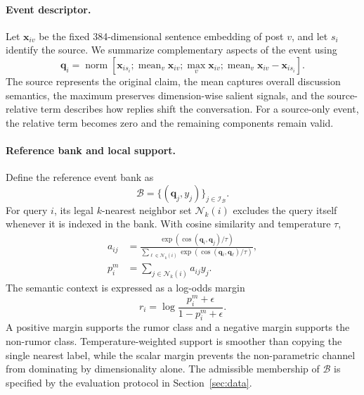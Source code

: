 \documentclass[sigconf,anonymous,review]{../acmart/acmart}
\newcommand{\norm}{\operatorname{norm}}
\newcommand{\mean}{\operatorname{mean}}
\newcommand{\maxpool}{\operatorname{max}}
\begin{document}
\paragraph{Event descriptor.}
Let $\boldsymbol{x}_{iv}$ be the fixed 384-dimensional sentence embedding of
post $v$, and let $s_i$ identify the source.  We summarize complementary
aspects of the event using
\begin{equation}
 \boldsymbol{q}_i=\norm\!\left[
 \boldsymbol{x}_{is_i};
 \mean_{v}\boldsymbol{x}_{iv};
 \maxpool_{v}\boldsymbol{x}_{iv};
 \mean_{v}\boldsymbol{x}_{iv}-\boldsymbol{x}_{is_i}
 \right].
 \label{eq:event-descriptor}
\end{equation}
The source represents the original claim, the mean captures overall
discussion semantics, the maximum preserves dimension-wise salient signals,
and the source-relative term describes how replies shift the conversation.
For a source-only event, the relative term becomes zero and the remaining
components remain valid.

\paragraph{Reference bank and local support.}
Define the reference event bank as
\begin{equation}
  \mathcal{B}=\{(\boldsymbol{q}_j,y_j)\}_{j\in\mathcal{I}_{\mathcal{B}}}.
  \label{eq:bank}
\end{equation}
For query $i$, its legal $k$-nearest neighbor set
$\mathcal{N}_k(i)$ excludes the query itself whenever it is indexed in the
bank.  With cosine similarity and temperature $\tau$,
\begin{align}
  a_{ij}
  &=\frac{\exp(\cos(\boldsymbol{q}_i,\boldsymbol{q}_j)/\tau)}
  {\sum_{\ell\in\mathcal{N}_k(i)}
   \exp(\cos(\boldsymbol{q}_i,\boldsymbol{q}_{\ell})/\tau)},\\
  p_i^m&=\sum_{j\in\mathcal{N}_k(i)}a_{ij}y_j.
  \label{eq:neighbor-support}
\end{align}
The semantic context is expressed as a log-odds margin
\begin{equation}
  r_i=\log
  \frac{p_i^m+\epsilon}{1-p_i^m+\epsilon}.
  \label{eq:context-margin}
\end{equation}
A positive margin supports the rumor class and a negative margin supports the
non-rumor class.  Temperature-weighted support is smoother than copying the
single nearest label, while the scalar margin prevents the non-parametric
channel from dominating by dimensionality alone.  The admissible membership
of $\mathcal{B}$ is specified by the evaluation protocol in
Section~\ref{sec:data}.
\end{document}

